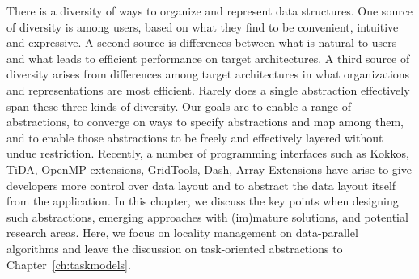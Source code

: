There is a diversity of ways to organize and represent data structures.  One source of diversity is among users, based on what they find to be convenient, intuitive and expressive.  A second source is differences between what is natural to users and what leads to efficient performance on target architectures.  A third source of diversity arises from differences among target architectures in what organizations and representations are most efficient.  Rarely does a single abstraction effectively span these three kinds of diversity.  Our goals are to enable a range of abstractions, to converge on ways to specify abstractions and map among them, and to enable those abstractions to be freely and effectively layered without undue restriction. Recently, a number of programming interfaces such as Kokkos, TiDA, OpenMP extensions, GridTools, Dash, Array Extensions \cite{all} have arise to give developers more control over 
 data layout and to abstract the data layout itself from the application. 
 In this chapter, we discuss the key points when designing such abstractions, emerging approaches with (im)mature
 solutions, and potential research areas. Here, we focus on  locality management on data-parallel algorithms 
 and leave the discussion on task-oriented abstractions to Chapter~\ref{ch:taskmodels}.



